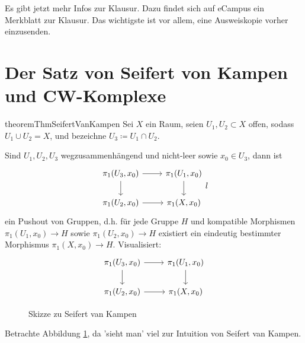 
\begin{orga}
    Es gibt jetzt mehr Infos zur Klausur. Dazu findet sich auf eCampus ein Merkblatt zur Klausur. Das wichtigste ist vor allem, eine Ausweiskopie vorher einzusenden.
\end{orga}

\section{Der Satz von Seifert von Kampen und CW-Komplexe}

\begin{restatable}{theorem}{ThmSeifertVanKampen}\label{thm:seifert-van-kampen}
    Sei $X$ ein Raum, seien  $U_1,U_2\subset X$ offen, sodass $U_1\cup U_2 = X$, und bezeichne  $U_3 \coloneqq  U_1 \cap U_2$.

    Sind $U_1,U_2,U_3$ wegzusammenhängend und nicht-leer sowie $x_0\in U_3$, dann ist
    \[
        \begin{tikzcd}[ampersand replacement = \&]
        \pi_1(U_3,x_0) \ar[swap]{d}{} \ar{r}{} \& \pi_1(U_1,x_0) \ar{d}{} \\
        \pi_1(U_2,x_0) \ar[swap]{r}{} \& \pi_1(X,x_0)
    \end{tikzcd}
    l\]
    ein Pushout von Gruppen, d.h. für jede Gruppe $H$ und kompatible Morphismen  $\pi_1(U_1,x_0) \to  H$ sowie $\pi_1(U_2,x_0) \to  H$ existiert ein eindeutig bestimmter Morphismus $\pi_1(X,x_0) \to  H$. Visualisiert:
    \[
        \begin{tikzcd}[ampersand replacement = \&]
        \pi_1(U_3,x_0) \ar[swap]{d}{} \ar{r}{} \& \pi_1(U_1,x_0) \ar{d}{} \\
        \pi_1(U_2,x_0) \ar[swap]{r}{} \& \pi_1(X,x_0)
    \end{tikzcd}
    \]
\end{restatable}

\begin{figure}[ht]
    \centering
    \caption{Skizze zu Seifert van Kampen}
    \label{fig:skizze-zu-seifert-van-kampen}
\end{figure}

Betrachte Abbildung \ref{fig:skizze-zu-seifert-van-kampen}, da 'sieht man' viel zur Intuition von Seifert van Kampen.


